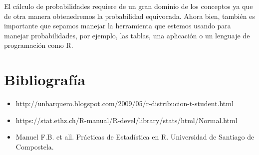 \documentclass{mylib/reporte}
\begin{document}
	El cálculo de probabilidades requiere de un gran dominio de los conceptos ya que de otra manera obtenedremos la probabilidad equivocada. Ahora bien, también es importante que sepamos manejar la herramienta que estemos usando para manejar probabilidades, por ejemplo, las tablas, una aplicación o un lenguaje de programación como R.

\section{Bibliografía}

\begin{itemize}
	\item http://unbarquero.blogspot.com/2009/05/r-distribucion-t-student.html
	\item https://stat.ethz.ch/R-manual/R-devel/library/stats/html/Normal.html
	\item Manuel F.B. et all. Prácticas de Estadística en R. Universidad de Santiago de Compostela.

\end{itemize}
\end{document}
